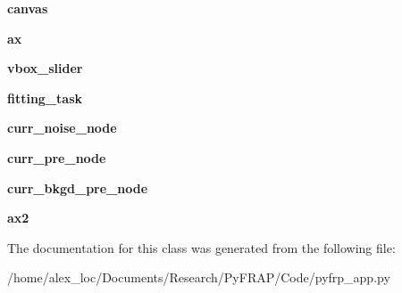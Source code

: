 \begin{DoxyCompactItemize}
\item 
\hypertarget{classpyfrp__app_1_1pyfrp_afa7678574d131a191340e52ac7b59993}{{\bfseries canvas}}\label{classpyfrp__app_1_1pyfrp_afa7678574d131a191340e52ac7b59993}

\item 
\hypertarget{classpyfrp__app_1_1pyfrp_a08f4e70d7293d4c4b2ee5c665adbdfa5}{{\bfseries ax}}\label{classpyfrp__app_1_1pyfrp_a08f4e70d7293d4c4b2ee5c665adbdfa5}

\item 
\hypertarget{classpyfrp__app_1_1pyfrp_a14f94727c06d243b221504bed83551d1}{{\bfseries vbox\+\_\+slider}}\label{classpyfrp__app_1_1pyfrp_a14f94727c06d243b221504bed83551d1}

\item 
\hypertarget{classpyfrp__app_1_1pyfrp_aa96a31dae613ffa31e89708fa3fba220}{{\bfseries fitting\+\_\+task}}\label{classpyfrp__app_1_1pyfrp_aa96a31dae613ffa31e89708fa3fba220}

\item 
\hypertarget{classpyfrp__app_1_1pyfrp_ab8089e5e5c6768504f399ebec67f844f}{{\bfseries curr\+\_\+noise\+\_\+node}}\label{classpyfrp__app_1_1pyfrp_ab8089e5e5c6768504f399ebec67f844f}

\item 
\hypertarget{classpyfrp__app_1_1pyfrp_a4657f5435a298d0de624341f5d5ef29b}{{\bfseries curr\+\_\+pre\+\_\+node}}\label{classpyfrp__app_1_1pyfrp_a4657f5435a298d0de624341f5d5ef29b}

\item 
\hypertarget{classpyfrp__app_1_1pyfrp_a578b6c70125d26fc248f67488c7113ed}{{\bfseries curr\+\_\+bkgd\+\_\+pre\+\_\+node}}\label{classpyfrp__app_1_1pyfrp_a578b6c70125d26fc248f67488c7113ed}

\item 
\hypertarget{classpyfrp__app_1_1pyfrp_a883860c8472b8f5abc59efd8acbbb351}{{\bfseries ax2}}\label{classpyfrp__app_1_1pyfrp_a883860c8472b8f5abc59efd8acbbb351}

\end{DoxyCompactItemize}


The documentation for this class was generated from the following file\+:\begin{DoxyCompactItemize}
\item 
/home/alex\+\_\+loc/\+Documents/\+Research/\+Py\+F\+R\+A\+P/\+Code/pyfrp\+\_\+app.\+py\end{DoxyCompactItemize}
